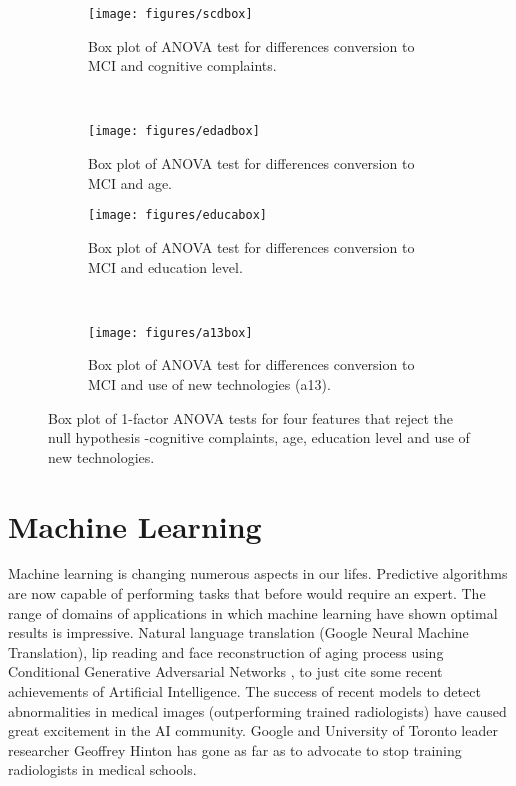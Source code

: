 \documentclass[11pt]{article}
\theoremstyle{definition}
\theoremstyle{remark}
\begin{document}
\begin{figure}[H]
    \centering
    \begin{subfigure}[t]{0.45\textwidth}
        \centering
        \texttt{[image: figures/scdbox]}
        \caption{Box plot of ANOVA test for differences conversion to MCI and cognitive complaints.}
    \end{subfigure}
    ~ 
    \begin{subfigure}[t]{0.45\textwidth}
        \centering
        \texttt{[image: figures/edadbox]}
        \caption{Box plot of ANOVA test for differences conversion to MCI and age.}
    \end{subfigure}%
    
     \begin{subfigure}[t]{0.45\textwidth}
        \centering
        \texttt{[image: figures/educabox]}
        \caption{Box plot of ANOVA test for differences conversion to MCI and education level.}
    \end{subfigure}
    ~ 
    \begin{subfigure}[t]{0.45\textwidth}
        \centering
        \texttt{[image: figures/a13box]}
        \caption{Box plot of ANOVA test for differences conversion to MCI and use of new technologies (a13).}
    \end{subfigure}%
    \caption{Box plot of 1-factor ANOVA tests for four features that reject the null hypothesis -cognitive complaints, age, education level and use of new technologies.} \label{fig:anovabox}
\end{figure}

\newpage
\section{Machine Learning} 
\label{se:mod}

Machine learning is changing numerous aspects in our lifes. Predictive algorithms are now capable of performing tasks that before would require an expert. The range of domains of applications in which machine learning have shown optimal results is impressive. Natural language translation (Google Neural Machine Translation), lip reading \cite{suwajanakorn2017synthesizing} and face  reconstruction of aging process using Conditional Generative Adversarial Networks \cite{antipov2017face}, to just cite some recent achievements of Artificial Intelligence.
The success of recent models to detect abnormalities in medical images (outperforming trained radiologists) have caused  great excitement in the AI community. Google and University of Toronto leader researcher Geoffrey Hinton has gone as far as to advocate to stop training radiologists in medical schools.
\end{document}
